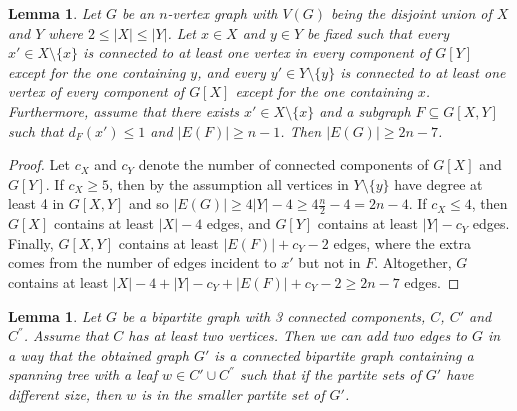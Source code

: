 \documentclass[12pt,a4paper]{amsart}
\theoremstyle{plain}
\newtheorem{lemma}[theorem]{Lemma}
\theoremstyle{definition}
\begin{document}
\begin{lemma}\label{edges2}
    Let $G$ be an $n$-vertex graph with $V(G)$ being the disjoint union of $X$ and $Y$ where $2\le |X|\le |Y|$. Let $x\in X$ and $y\in Y$ be fixed such that every $x'\in X\setminus \{x\}$ is connected to at least one vertex in every component of $G[Y]$ except for the one containing $y$, and every  $y'\in Y\setminus \{y\}$ is connected to at least one vertex of every component of $G[X]$ except for the one containing $x$. Furthermore, assume that there exists $x'\in X \setminus \{x\}$ and a subgraph $F \subseteq G[X,Y]$ such that $d_F(x')\le 1$ and $|E(F)|\ge n-1$. Then $|E(G)|\ge 2n-7$. 
\end{lemma}

\begin{proof}
    Let $c_X$ and $c_Y$ denote the number of connected components of $G[X]$ and $G[Y]$. If $c_X\ge 5$, then by the assumption all vertices in $Y\setminus \{y\}$ have degree at least 4 in $G[X,Y]$ and so $|E(G)|\ge 4|Y|-4\ge 4\frac{n}{2}-4=2n-4$. If $c_X\le 4$, then $G[X]$ contains at least $|X|-4$ edges, and $G[Y]$ contains at least $|Y|-c_Y$ edges. Finally, $G[X,Y]$ contains at least $|E(F)|+c_Y-2$ edges, where the extra comes from the number of edges incident to $x'$ but not in $F$. Altogether, $G$ contains at least $|X|-4+|Y|-c_Y+|E(F)|+c_Y-2\ge 2n-7$ edges.
\end{proof}

\begin{lemma}\label{three_components}
Let $G$ be a bipartite graph with 3 connected components, $C$, $C'$ and $C^{''}$. Assume that $C$ has at least two vertices. Then we can add two edges to $G$ in a way that the obtained graph $G'$ is a connected bipartite graph containing a spanning tree with a leaf $w \in C' \cup C^{''}$ such that if the partite sets of $G'$ have different size, then $w$ is in the smaller partite set of $G'$.
\end{lemma}
\end{document}
